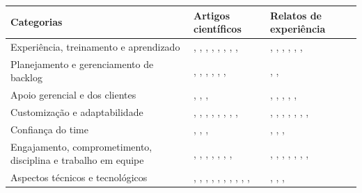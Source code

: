 \begin{table}[H]
	\centering
	\begin{tabularx}{\linewidth}{ | p{6cm} | X | X | }
		\hline 
		\textbf{Categorias} & \textbf{Artigos científicos} & \textbf{Relatos de experiência} \\ 
		\hline 
		Experiência, treinamento e aprendizado & \cite{Hajjdiab2011}, \cite{Block2011}, \cite{Adobe2012}, \cite{Cisco2011}, \cite{Lapham2012}, \cite{Eunha2012}, \cite{Claudia2013}, \cite{Asnawi2012}, \cite{Fitzgerald2013} & \cite{Stefano2013}, \cite{Rodrigues2013}, \cite{Bastos2013}, \cite{Maciel2013}, \cite{Karaj2013}, \cite{Piegas2012}, \cite{Vieira2013} \\ 
		\hline 
		Planejamento e gerenciamento de backlog & \cite{Hajjdiab2011}, \cite{Fitzgerald2013}, \cite{Block2011}, \cite{Adobe2012}, \cite{Bustard2013}, \cite{Korhonen2010}, \cite{Claudia2013} & \cite{Piegas2012}, \cite{Hui2013}, \cite{Parzinello2012} \\ 
		\hline 
		Apoio gerencial e dos clientes & \cite{Hajjdiab2011}, \cite{Cisco2011}, \cite{Claudia2013}, \cite{Arikpo2011} & \cite{Parzinello2012}, \cite{Stefano2013}, \cite{Bastos2013}, \cite{Maciel2013}, \cite{Srinath2012}, \cite{Piegas2012} \\ 
		\hline 
		Customização e adaptabilidade & \cite{Hajjdiab2011}, \cite{Block2011}, \cite{Asnawi2012}, \cite{Fitzgerald2013}, \cite{Bustard2013}, \cite{Microsoft2013}, \cite{Lapham2012}, \cite{Claudia2013}, \cite{Nokia2013} & \cite{Piegas2012}, \cite{Hui2013}, \cite{Rodrigues2013}, \cite{Bastos2013}, \cite{Maciel2013}, \cite{Ahmed2008}, \cite{Sahota2012}, \cite{Vieira2013} \\ 
		\hline 
		Confiança do time & \cite{Block2011}, \cite{Asnawi2012}, \cite{Claudia2013}, \cite{Nokia2013} & \cite{Parzinello2012}, \cite{Ahmed2008}, \cite{Piegas2012}, \cite{Bastos2013} \\ 
		\hline 
		Engajamento, comprometimento, disciplina e trabalho em equipe & \cite{Block2011}, \cite{Asnawi2012}, \cite{Lapham2012}, \cite{Microsoft2013}, \cite{Claudia2013}, \cite{Nokia2013}, \cite{Adobe2012}, \cite{Fitzgerald2013} & \cite{Piegas2012}, \cite{Parzinello2012}, \cite{Stefano2013}, \cite{Rodrigues2013}, \cite{Maciel2013}, \cite{Queiroz2013}, \cite{Bastos2013}, \cite{Ahmed2008} \\ 
		\hline 
		Aspectos técnicos e tecnológicos & \cite{Block2011}, \cite{Microsoft2013}, \cite{Korhonen2010}, \cite{Cisco2011}, \cite{Lapham2012}, \cite{Eunha2012}, \cite{Fitzgerald2013}, \cite{Arikpo2011}, \cite{Bustard2013}, \cite{Radha2012}, \cite{Nokia2013} & \cite{Piegas2012}, \cite{Queiroz2013}, \cite{Stefano2013}, \cite{Karaj2013} \\ 

\end{tabularx}
\end{table}
